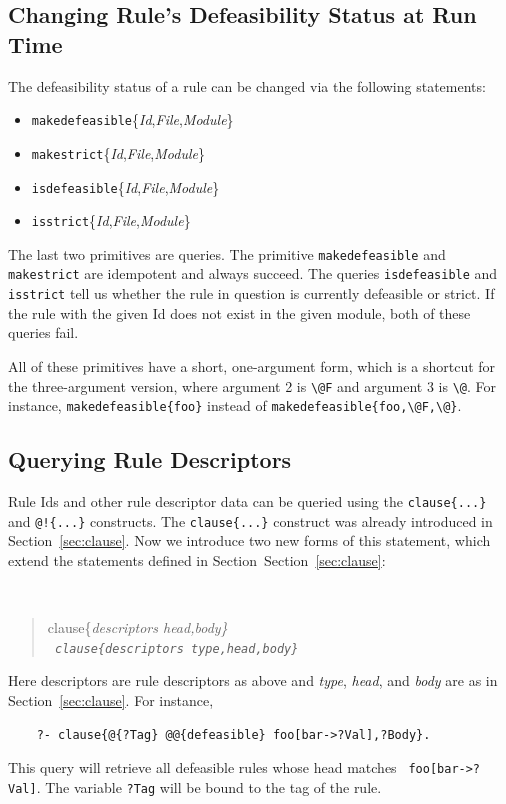 \documentclass[11pt]{article}
\newcommand{\bs}{\textbackslash}
\begin{document}

\subsection{Changing Rule's Defeasibility Status at Run Time}
The defeasibility status of a rule can be changed via the following
statements:
\begin{itemize}
\item  \texttt{makedefeasible}\{\emph{Id},\emph{File},\emph{Module}\}
\item  \texttt{makestrict}\{\emph{Id},\emph{File},\emph{Module}\}
\item  \texttt{isdefeasible}\{\emph{Id},\emph{File},\emph{Module}\}
\item  \texttt{isstrict}\{\emph{Id},\emph{File},\emph{Module}\}
\end{itemize}
The last two primitives are queries. The primitive \texttt{makedefeasible}
and \texttt{makestrict} are idempotent and always succeed. The queries
\texttt{isdefeasible} and \texttt{isstrict} tell us whether the rule in
question is currently defeasible or strict.    
If the rule with the given Id does not exist in the given module, both of
these queries fail.

All of these primitives have a short, one-argument form, which is a
shortcut for the three-argument version, where argument 2 is \texttt{\bs{}@F}
and argument 3 is \texttt{\bs{}@}. For instance,
\texttt{makedefeasible\{foo\}} instead of
\texttt{makedefeasible\{foo,\bs{}@F,\bs{}@\}}. 

\subsection{Querying Rule Descriptors}\label{sec-descr-queries}

Rule Ids and other rule descriptor
data can be queried using the  \texttt{clause\{...\}}
and \texttt{@!\{...\}} constructs. The  \texttt{clause\{...\}}
construct was already
introduced in Section~\ref{sec:clause}. Now we introduce two new forms of this
statement, which extend the statements
defined in Section~Section~\ref{sec:clause}:
{\tt
\begin{quote}
clause\{\it{descriptors head,body}\}\\
\tt
clause\{\it{descriptors type,head,body}\}
\end{quote}
}
Here descriptors are rule descriptors as above and
\emph{type}, \emph{head}, and \emph{body} are as in
Section~\ref{sec:clause}. 
For instance,
\begin{verbatim}
    ?- clause{@{?Tag} @@{defeasible} foo[bar->?Val],?Body}.
\end{verbatim}
This query will retrieve all defeasible rules whose head matches {\tt
  foo[bar->?Val]}. The variable \texttt{?Tag} will be bound to the tag of
the rule. 
\end{document}
